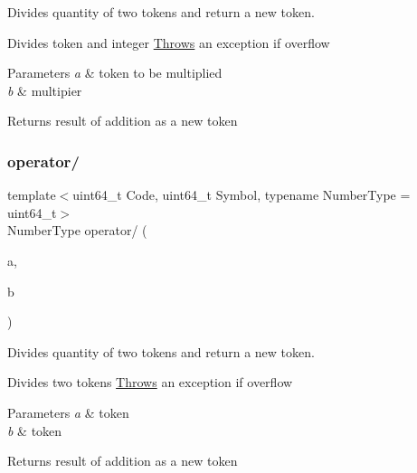 Divides quantity of two tokens and return a new token. 

Divides token and integer \mbox{\hyperlink{struct_throws}{Throws}} an exception if overflow 
\begin{DoxyParams}{Parameters}
{\em a} & token to be multiplied \\
\hline
{\em b} & multipier \\
\hline
\end{DoxyParams}
\begin{DoxyReturn}{Returns}
result of addition as a new token 
\end{DoxyReturn}
\mbox{\label{classaacio_1_1token_a050f626d33d35899977abb07e1d35575}} 
\subsubsection{\texorpdfstring{operator/}{operator/}\hspace{0.1cm}{\footnotesize\ttfamily [2/2]}}
{\footnotesize\ttfamily template$<$uint64\+\_\+t Code, uint64\+\_\+t Symbol, typename Number\+Type  = uint64\+\_\+t$>$ \\
Number\+Type operator/ (\begin{DoxyParamCaption}\item[{const \mbox{\hyperlink{classaacio_1_1token}{token}}$<$ Code, Symbol, Number\+Type $>$ \&}]{a,  }\item[{const \mbox{\hyperlink{classaacio_1_1token}{token}}$<$ Code, Symbol, Number\+Type $>$ \&}]{b }\end{DoxyParamCaption})\hspace{0.3cm}{\ttfamily [friend]}}



Divides quantity of two tokens and return a new token. 

Divides two tokens \mbox{\hyperlink{struct_throws}{Throws}} an exception if overflow 
\begin{DoxyParams}{Parameters}
{\em a} & token \\
\hline
{\em b} & token \\
\hline
\end{DoxyParams}
\begin{DoxyReturn}{Returns}
result of addition as a new token 
\end{DoxyReturn}
\mbox{\label{classaacio_1_1token_acba3f114f474466a7c6c8a77b88723df}} 
